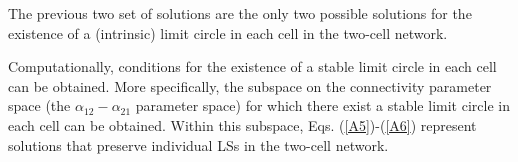 The previous two set of solutions are the only two possible solutions for the existence of a (intrinsic) limit circle in each cell in the two-cell network.

Computationally, conditions for the existence of a stable limit circle in each cell can be obtained. More specifically, the subspace on the connectivity parameter space (the $\alpha_{12}-\alpha_{21}$ parameter space) for which there exist a stable limit circle in each cell can be obtained. Within this subspace, Eqs. (\ref{A5})-(\ref{A6}) represent solutions that preserve individual LSs in the two-cell network.

